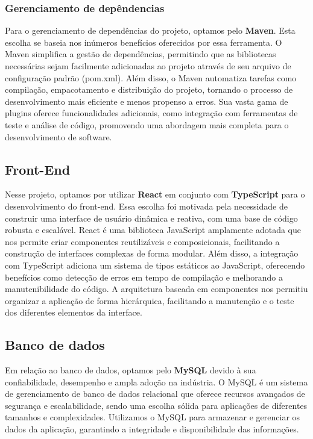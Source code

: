 \subsubsection{Gerenciamento de depêndencias}
Para o gerenciamento de dependências do projeto, optamos pelo \textbf{Maven}. Esta escolha se baseia nos inúmeros benefícios oferecidos por essa ferramenta. O Maven simplifica a gestão de dependências, permitindo que as bibliotecas necessárias sejam facilmente adicionadas ao projeto através de seu arquivo de configuração padrão (pom.xml). Além disso, o Maven automatiza tarefas como compilação, empacotamento e distribuição do projeto, tornando o processo de desenvolvimento mais eficiente e menos propenso a erros. Sua vasta gama de plugins oferece funcionalidades adicionais, como integração com ferramentas de teste e análise de código, promovendo uma abordagem mais completa para o desenvolvimento de software. 

\subsection{Front-End}
Nesse projeto, optamos por utilizar \textbf{React} em conjunto com \textbf{TypeScript} para o desenvolvimento do front-end. Essa escolha foi motivada pela necessidade de construir uma interface de usuário dinâmica e reativa, com uma base de código robusta e escalável. React é uma biblioteca JavaScript amplamente adotada que nos permite criar componentes reutilizáveis e composicionais, facilitando a construção de interfaces complexas de forma modular. Além disso, a integração com TypeScript adiciona um sistema de tipos estáticos ao JavaScript, oferecendo benefícios como detecção de erros em tempo de compilação e melhorando a manutenibilidade do código. A arquitetura baseada em componentes nos permitiu organizar a aplicação de forma hierárquica, facilitando a manutenção e o teste dos diferentes elementos da interface.
 
\subsection{Banco de dados}
Em relação ao banco de dados,  optamos pelo \textbf{MySQL} devido à sua confiabilidade, desempenho e ampla adoção na indústria. O MySQL é um sistema de gerenciamento de banco de dados relacional que oferece recursos avançados de segurança e escalabilidade, sendo uma escolha sólida para aplicações de diferentes tamanhos e complexidades. Utilizamos o MySQL para armazenar e gerenciar os dados da aplicação, garantindo a integridade e disponibilidade das informações.

